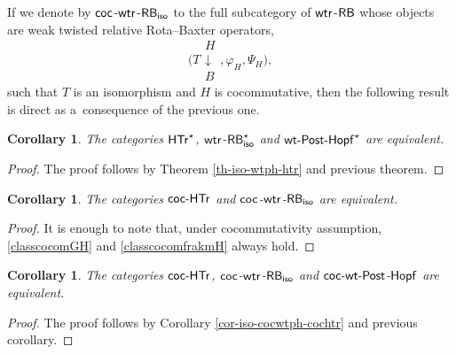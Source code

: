 \documentclass[10pt,a4paper]{amsart}
\numberwithin{equation}{section}
\newtheorem{Corollary}[Theorem]{Corollary}
\begin{document}
If we denote by ${\sf coc}$-${\sf wtr}$-${\sf RB}_{{\sf iso}}$ to the full subcategory of ${\sf wtr}$-${\sf RB}$ whose objects are weak twisted relative Rota--Baxter operators,
\[
\Biggl(T\begin{array}{c}H\\\downarrow\\B\end{array},\varphi_{H},\Psi_{H}\Biggr),
\]
such that $T$ is an isomorphism and $H$ is cocommutative, then the following result is direct as a~consequence of the previous one.
\begin{Corollary}

The categories $\sf{HTr}^{\star}$, ${\sf wtr}$-${\sf RB}^{\star}_{{\sf iso}}$ and ${\sf wt}\textnormal{-}{\sf Post}\textnormal{-}{\sf Hopf}^{\star}$ are equivalent.
\end{Corollary}
\begin{proof}
The proof follows by Theorem \ref{th-iso-wtph-htr} and previous theorem.
\end{proof}

\begin{Corollary}
The categories ${\sf coc}\textnormal{-}{\sf HTr}$ and ${\sf coc}$-${\sf wtr}$-${\sf RB}_{{\sf iso}}$ are equivalent.
\end{Corollary}
\begin{proof}
It is enough to note that, under cocommutativity assumption, \eqref{classcocomGH} and \eqref{classcocomfrakmH} always hold.
\end{proof}

\begin{Corollary}
The categories ${\sf coc}\textnormal{-}{\sf HTr}$, ${\sf coc}$-${\sf wtr}$-${\sf RB}_{{\sf iso}}$ and $\sf{coc}\textnormal{-}{\sf wt}\textnormal{-}{\sf Post}$-$\sf{Hopf}$ are equivalent.
\end{Corollary}
\begin{proof}
The proof follows by Corollary \ref{cor-iso-cocwtph-cochtr} and previous corollary.
\end{proof}
\end{document}
